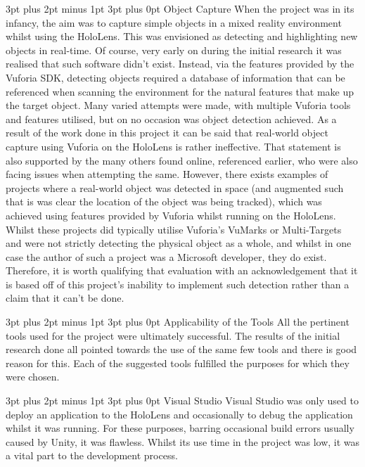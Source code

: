 \documentclass[12pt,a4paper,oneside]{article}
\makeatletter
\renewcommand\subsubsection{\@startsection {subsubsection}{1}{0mm} %
	                           {3pt plus 2pt minus 1pt} %
	                           {3pt plus 0pt} %
	                           {\normalfont\bfseries}}
\renewcommand\subsection{\@startsection {subsection}{1}{0mm} %
                               {3pt plus 2pt minus 1pt} %
                               {3pt plus 0pt} %
                               {\large\bfseries}}
\makeatother
\begin{document}
\subsection{Object Capture}
When the project was in its infancy, the aim was to capture simple objects in a mixed reality environment whilst using the HoloLens. This was envisioned as detecting and highlighting new objects in real-time. Of course, very early on during the initial research it was realised that such software didn't exist. Instead, via the features provided by the Vuforia SDK, detecting objects required a database of information that can be referenced when scanning the environment for the natural features that make up the target object. Many varied attempts were made, with multiple Vuforia tools and features utilised, but on no occasion was object detection achieved. As a result of the work done in this project it can be said that real-world object capture using Vuforia on the HoloLens is rather ineffective. That statement is also supported by the many others found online, referenced earlier, who were also facing issues when attempting the same. However, there exists examples of projects where a real-world object was detected in space (and augmented such that is was clear the location of the object was being tracked), which was achieved using features provided by Vuforia whilst running on the HoloLens. Whilst these projects did typically utilise Vuforia's VuMarks or Multi-Targets and were not strictly detecting the physical object as a whole, and whilst in one case the author of such a project was a Microsoft developer, they do exist. Therefore, it is worth qualifying that evaluation with an acknowledgement that it is based off of this project's inability to implement such detection rather than a claim that it can't be done.

\subsection{Applicability of the Tools}
All the pertinent tools used for the project were ultimately successful. The results of the initial research done all pointed towards the use of the same few tools and there is good reason for this. Each of the suggested tools fulfilled the purposes for which they were chosen. 

\subsubsection{Visual Studio}
Visual Studio was only used to deploy an application to the HoloLens and occasionally to debug the application whilst it was running. For these purposes, barring occasional build errors usually caused by Unity, it was flawless. Whilst its use time in the project was low, it was a vital part to the development process.
\end{document}
